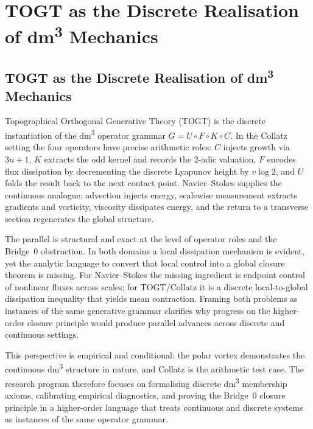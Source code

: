 \documentclass[11pt,a4paper]{article}
\theoremstyle{definition}
\theoremstyle{plain}
\begin{document}
\section{TOGT as the Discrete Realisation of dm\textsuperscript{3} Mechanics}
\label{sec:togt-discrete}

\subsection{TOGT as the Discrete Realisation of dm\textsuperscript{3} Mechanics}

Topographical Orthogonal Generative Theory (TOGT) is the discrete instantiation of the
dm\textsuperscript{3} operator grammar $G = U \circ F \circ K \circ C$. In the Collatz setting
the four operators have precise arithmetic roles: $C$ injects growth via $3n+1$, $K$ extracts
the odd kernel and records the 2-adic valuation, $F$ encodes flux dissipation by decrementing
the discrete Lyapunov height by $v\log 2$, and $U$ folds the result back to the next contact
point. Navier--Stokes supplies the continuous analogue: advection injects energy, scalewise
measurement extracts gradients and vorticity, viscosity dissipates energy, and the return to a
transverse section regenerates the global structure.

The parallel is structural and exact at the level of operator roles and the Bridge~0
obstruction. In both domains a local dissipation mechanism is evident, yet the analytic language
to convert that local control into a global closure theorem is missing. For Navier--Stokes the
missing ingredient is endpoint control of nonlinear fluxes across scales; for TOGT/Collatz it is
a discrete local-to-global dissipation inequality that yields mean contraction. Framing both
problems as instances of the same generative grammar clarifies why progress on the
higher-order closure principle would produce parallel advances across discrete and continuous
settings.

This perspective is empirical and conditional: the polar vortex demonstrates the continuous
dm\textsuperscript{3} structure in nature, and Collatz is the arithmetic test case. The research
program therefore focuses on formalising discrete dm\textsuperscript{3} membership axioms,
calibrating empirical diagnostics, and proving the Bridge~0 closure principle in a higher-order
language that treats continuous and discrete systems as instances of the same operator grammar.
\end{document}
